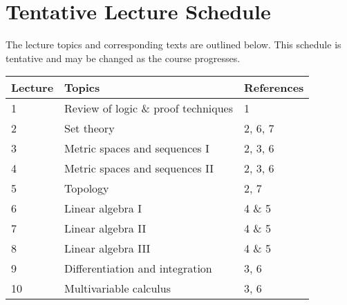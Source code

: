 \documentclass[12pt]{article}
\begin{document}
%
%




\section{Tentative Lecture Schedule}
The lecture topics and corresponding texts are outlined below.  This schedule is tentative and may be changed as the course progresses.


\begin{longtable}{| p{1.5cm}  | p{8cm} | p{3cm} |}
\hline
{\bf{Lecture}}  & {\bf{Topics}} &  {\bf{References}} \\
\hline
1  & Review of logic \& proof techniques &  1 \\
\hline
2  & Set theory & 2, 6, 7 \\
\hline
3  &  Metric spaces and sequences I &  2, 3, 6\\
\hline
4  & Metric spaces and sequences II &  2, 3, 6\\
\hline
5  & Topology & 2, 7 \\
\hline
6 &  Linear algebra I & 4 \& 5 \\
\hline
7  &  Linear algebra II & 4 \& 5 \\
 \hline
8  & Linear algebra III &  4 \& 5 \\
 \hline
9  &  Differentiation and integration & 3,  6\\
\hline
10  &   Multivariable calculus & 3, 6 \\
\hline
\end{longtable}
\end{document}
